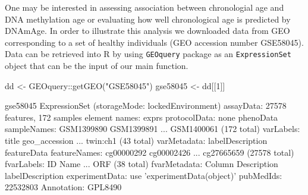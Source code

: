 \documentclass[]{article}
\newcommand{\hlnum}[1]{\textcolor[rgb]{0.816,0.125,0.439}{#1}}%
\newcommand{\hlstr}[1]{\textcolor[rgb]{0.251,0.627,0.251}{#1}}%
\newcommand{\hlopt}[1]{\textcolor[rgb]{0,0,0}{#1}}%
\newcommand{\hlstd}[1]{\textcolor[rgb]{0.251,0.251,0.251}{#1}}%
\newcommand{\hlkwd}[1]{\textcolor[rgb]{0.878,0.439,0.125}{#1}}%
\newenvironment{Shaded}{\begin{myshaded}}{\end{myshaded}}
\newcommand{\KeywordTok}[1]{\hlkwd{#1}}
\newcommand{\DecValTok}[1]{\hlnum{#1}}
\newcommand{\StringTok}[1]{\hlstr{#1}}
\newcommand{\OperatorTok}[1]{\hlopt{#1}}
\newcommand{\NormalTok}[1]{\hlstd{#1}}
\begin{document}
One may be interested in assessing association between chronologial age and DNA methylation age or evaluating how well chronological age is predicted by DNAmAge. In order to illustrate this analysis we downloaded data from GEO corresponding to a set of healthy individuals (GEO accession number GSE58045). Data can be retrieved into R by using \texttt{GEOquery} package as an \texttt{ExpressionSet} object that can be the input of our main function.

\begin{Shaded}
\begin{Highlighting}[]
\NormalTok{dd <-}\StringTok{ }\NormalTok{GEOquery}\OperatorTok{::}\KeywordTok{getGEO}\NormalTok{(}\StringTok{"GSE58045"}\NormalTok{)}
\NormalTok{gse58045 <-}\StringTok{ }\NormalTok{dd[[}\DecValTok{1}\NormalTok{]]}
\end{Highlighting}
\end{Shaded}

\begin{Shaded}
\begin{Highlighting}[]
\NormalTok{gse58045}
  \KeywordTok{ExpressionSet}\NormalTok{ (storageMode}\OperatorTok{:}\StringTok{ }\NormalTok{lockedEnvironment)}
\NormalTok{  assayData}\OperatorTok{:}\StringTok{ }\DecValTok{27578}\NormalTok{ features, }\DecValTok{172}\NormalTok{ samples }
\NormalTok{    element names}\OperatorTok{:}\StringTok{ }\NormalTok{exprs }
\NormalTok{  protocolData}\OperatorTok{:}\StringTok{ }\NormalTok{none}
\NormalTok{  phenoData}
\NormalTok{    sampleNames}\OperatorTok{:}\StringTok{ }\NormalTok{GSM1399890 GSM1399891 ... }\KeywordTok{GSM1400061}\NormalTok{ (}\DecValTok{172}\NormalTok{ total)}
\NormalTok{    varLabels}\OperatorTok{:}\StringTok{ }\NormalTok{title geo_accession ... twin}\OperatorTok{:}\KeywordTok{ch1}\NormalTok{ (}\DecValTok{43}\NormalTok{ total)}
\NormalTok{    varMetadata}\OperatorTok{:}\StringTok{ }\NormalTok{labelDescription}
\NormalTok{  featureData}
\NormalTok{    featureNames}\OperatorTok{:}\StringTok{ }\NormalTok{cg00000292 cg00002426 ... }\KeywordTok{cg27665659}\NormalTok{ (}\DecValTok{27578}\NormalTok{ total)}
\NormalTok{    fvarLabels}\OperatorTok{:}\StringTok{ }\NormalTok{ID Name ... }\KeywordTok{ORF}\NormalTok{ (}\DecValTok{38}\NormalTok{ total)}
\NormalTok{    fvarMetadata}\OperatorTok{:}\StringTok{ }\NormalTok{Column Description labelDescription}
\NormalTok{  experimentData}\OperatorTok{:}\StringTok{ }\NormalTok{use }\StringTok{'experimentData(object)'}
\NormalTok{    pubMedIds}\OperatorTok{:}\StringTok{ }\DecValTok{22532803} 
\NormalTok{  Annotation}\OperatorTok{:}\StringTok{ }\NormalTok{GPL8490}
\end{Highlighting}
\end{Shaded}
\end{document}
